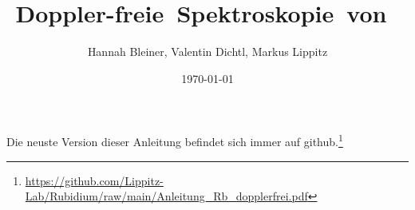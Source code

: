 \documentclass[notoc,nofonts,a4paper,twoside,nobib]{tufte-book}
\begin{document}
\sloppy
\tikzexternaldisable


\title{\hbox{Doppler-freie Spektroskopie von }}

\author{Hannah Bleiner, Valentin Dichtl, Markus Lippitz}
\date{\today}


\maketitle





\thispagestyle{show_doclicense}
\tableofcontents

\vfil
Die neuste Version dieser Anleitung befindet sich immer auf github.\footnote{\url{https://github.com/Lippitz-Lab/Rubidium/raw/main/Anleitung_Rb_dopplerfrei.pdf}} 

\vspace*{2\baselineskip}

\begin{minipage}{17mm}
  \doclicenseImage%
\end{minipage}
\begin{minipage}{\textwidth-23mm}
   \footnotesize
   \doclicenseLongText
\end{minipage}%


\newpage
\listofanswer



\newpage



\appendix


%

	\printbibliography
\end{document}
